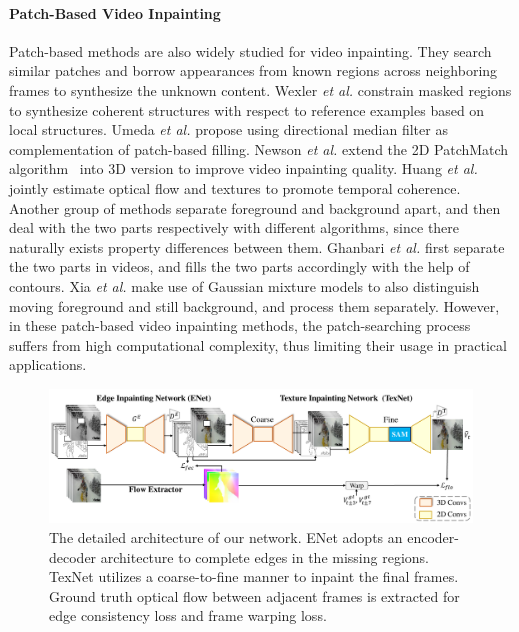 \paragraph{Patch-Based Video Inpainting} Patch-based methods are also widely studied for video inpainting. 
They search similar patches and borrow appearances from known regions across neighboring frames to synthesize the unknown content. 
Wexler \emph{et al.} \cite{wexler2007space} constrain masked regions to synthesize coherent structures with respect to reference examples based on local structures. 
Umeda \emph{et al.} \cite{umeda2012removal} propose using directional median filter as complementation of patch-based filling.
Newson \emph{et al.} \cite{newson2014video} extend the 2D PatchMatch algorithm~\cite{barnes2009patchmatch} into 3D version to improve video inpainting quality.
Huang \emph{et al.} \cite{huang2016temporally} jointly estimate optical flow and textures to promote temporal coherence.
%
Another group of methods separate foreground and background apart, and then deal with the two parts respectively with different algorithms, since there naturally exists property differences between them.  
Ghanbari \emph{et al.} \cite{ghanbari2011contour} first separate the two parts in videos, and fills the two parts accordingly with the help of contours.
Xia \emph{et al.} \cite{xia2011exemplar} make use of Gaussian mixture models to also distinguish moving foreground and still background, and process them separately.   
However, in these patch-based video inpainting methods, the patch-searching process suffers from high computational complexity, thus limiting their usage in practical applications.



\begin{figure}[!t]
	\centering
	\includegraphics[width=2.05\columnwidth]{sti} %
	\caption{The detailed architecture of our network. ENet adopts an encoder-decoder architecture to complete edges in the missing regions. TexNet utilizes a coarse-to-fine manner to inpaint the final frames. Ground truth optical flow between adjacent frames is extracted for edge consistency loss and frame warping loss. }
	\label{fig:stiNet}
\end{figure}


